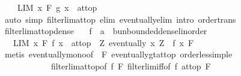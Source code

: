 \begin{isabellebody}
\ \ \ \ LIM\ x\ F{\isachardot}{\kern0pt}\ g\ x\ {\isacharcolon}{\kern0pt}{\isachargreater}{\kern0pt}\ at{\isacharunderscore}{\kern0pt}top{\isachardoublequoteclose}\isanewline
%
\isadelimproof
\ \ %
\endisadelimproof
%
\isatagproof
{}\isamarkupfalse%
\ {\isacharparenleft}{\kern0pt}auto\ simp{\isacharcolon}{\kern0pt}\ filterlim{\isacharunderscore}{\kern0pt}at{\isacharunderscore}{\kern0pt}top\ elim{\isacharcolon}{\kern0pt}\ eventually{\isacharunderscore}{\kern0pt}elim{}\ intro{\isacharcolon}{\kern0pt}\ order{\isacharunderscore}{\kern0pt}trans{\isacharparenright}{\kern0pt}%
\endisatagproof
{\isafoldproof}%
%
\isadelimproof
\isanewline
%
\endisadelimproof
\isanewline
{}\isamarkupfalse%
\ filterlim{\isacharunderscore}{\kern0pt}at{\isacharunderscore}{\kern0pt}top{\isacharunderscore}{\kern0pt}dense{\isacharcolon}{\kern0pt}\isanewline
\ \ \ f\ {\isacharcolon}{\kern0pt}{\isacharcolon}{\kern0pt}\ {\isachardoublequoteopen}{\isacharprime}{\kern0pt}a\ {\isasymRightarrow}\ {\isacharparenleft}{\kern0pt}{\isacharprime}{\kern0pt}b{\isacharcolon}{\kern0pt}{\isacharcolon}{\kern0pt}unbounded{\isacharunderscore}{\kern0pt}dense{\isacharunderscore}{\kern0pt}linorder{\isacharparenright}{\kern0pt}{\isachardoublequoteclose}\isanewline
\ \ \ {\isachardoublequoteopen}{\isacharparenleft}{\kern0pt}LIM\ x\ F{\isachardot}{\kern0pt}\ f\ x\ {\isacharcolon}{\kern0pt}{\isachargreater}{\kern0pt}\ at{\isacharunderscore}{\kern0pt}top{\isacharparenright}{\kern0pt}\ {\isasymlongleftrightarrow}\ {\isacharparenleft}{\kern0pt}{\isasymforall}Z{\isachardot}{\kern0pt}\ eventually\ {\isacharparenleft}{\kern0pt}{\isasymlambda}x{\isachardot}{\kern0pt}\ Z\ {\isacharless}{\kern0pt}\ f\ x{\isacharparenright}{\kern0pt}\ F{\isacharparenright}{\kern0pt}{\isachardoublequoteclose}\isanewline
%
\isadelimproof
\ \ %
\endisadelimproof
%
\isatagproof
{}\isamarkupfalse%
\ {\isacharparenleft}{\kern0pt}metis\ eventually{\isacharunderscore}{\kern0pt}mono{\isacharbrackleft}{\kern0pt}of\ {\isacharunderscore}{\kern0pt}\ F{\isacharbrackright}{\kern0pt}\ eventually{\isacharunderscore}{\kern0pt}gt{\isacharunderscore}{\kern0pt}at{\isacharunderscore}{\kern0pt}top\ order{\isacharunderscore}{\kern0pt}less{\isacharunderscore}{\kern0pt}imp{\isacharunderscore}{\kern0pt}le\isanewline
\ \ \ \ \ \ \ \ \ \ \ \ filterlim{\isacharunderscore}{\kern0pt}at{\isacharunderscore}{\kern0pt}top{\isacharbrackleft}{\kern0pt}of\ f\ F{\isacharbrackright}{\kern0pt}\ filterlim{\isacharunderscore}{\kern0pt}iff{\isacharbrackleft}{\kern0pt}of\ f\ at{\isacharunderscore}{\kern0pt}top\ F{\isacharbrackright}{\kern0pt}{\isacharparenright}{\kern0pt}%

\end{isabellebody}

